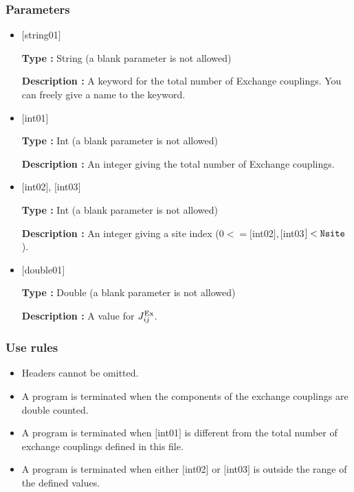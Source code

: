 \subsubsection{Parameters}
 \begin{itemize}

   \item  $[$string01$]$
   
    {\bf Type :} String (a blank parameter is not allowed)

   {\bf Description :}  A keyword for the total number of Exchange couplings. You can freely give a name to the keyword.

   \item  $[$int01$]$
   
    {\bf Type :} Int (a blank parameter is not allowed)

   {\bf Description :} An integer giving the total number of Exchange couplings.

  \item  $[$int02$]$, $[$int03$]$
  
 {\bf Type :} Int (a blank parameter is not allowed)

{\bf Description :} An integer giving a site index ($0<= [$int02$], [$int03$]<\verb|Nsite|$).
 
 \item  $[$double01$]$
   
   {\bf Type :} Double (a blank parameter is not allowed)

  {\bf Description :}   A value for $J_{ij}^{\rm Ex}$.
  
\end{itemize}

\subsubsection{Use rules}
\begin{itemize}
\item Headers cannot be omitted. 
\item A program is terminated when the components of the exchange couplings are double counted.
\item A program is terminated when $[$int01$]$ is different from the total number of exchange couplings defined in this file.
\item A program is terminated when either $[$int02$]$ or $[$int03$]$ is outside the range of the defined values.
\end{itemize}


\newpage
